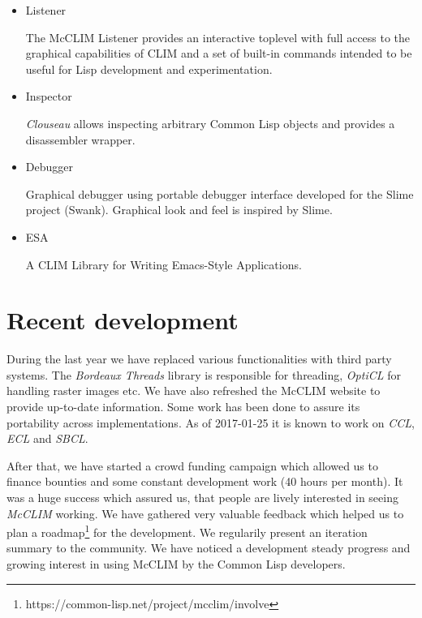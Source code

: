 \documentclass{sig-alternate-05-2015}
\begin{document}
\begin{itemize}

\item Listener

  The McCLIM Listener provides an interactive toplevel with full
  access to the graphical capabilities of CLIM and a set of built-in
  commands intended to be useful for Lisp development and
  experimentation.

\item Inspector

  \emph{Clouseau} allows inspecting arbitrary Common Lisp objects and
  provides a disassembler wrapper.

\item Debugger

  Graphical debugger using portable debugger interface developed for
  the Slime project (Swank). Graphical look and feel is inspired by
  Slime.

\item ESA\cite{Strandh:2007:ECL:1622123.1622150}

  A CLIM Library for Writing Emacs-Style Applications.

\end{itemize}

\section{Recent development}

During the last year we have replaced various functionalities with
third party systems. The \emph{Bordeaux Threads} library is
responsible for threading, \emph{OptiCL} for handling raster images
etc. We have also refreshed the McCLIM website to provide up-to-date
information. Some work has been done to assure its portability across
implementations. As of 2017-01-25 it is known to work on \emph{CCL},
\emph{ECL} and \emph{SBCL}.

After that, we have started a crowd funding campaign which allowed us
to finance bounties and some constant development work (40 hours per
month). It was a huge success which assured us, that people are lively
interested in seeing \emph{McCLIM} working. We have gathered very
valuable feedback which helped us to plan a
roadmap\footnote{https://common-lisp.net/project/mcclim/involve} for
the development. We regularily present an iteration summary to the
community. We have noticed a development steady progress and growing
interest in using McCLIM by the Common Lisp developers.
\end{document}
